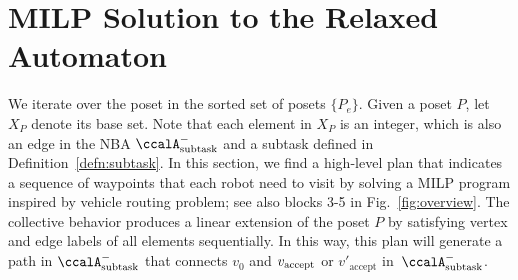 \documentclass[Afour,sageh,times]{sagej}
\newtheorem{exmp}{Example}
\newcommand{\auto}[1]{\ccalA_{\textup{#1}}}
\newcommand{\vertex}[1]{v_{\textup{#1}}}
\newenvironment{cexmp}
{\addtocounter{exmp}{-1}\begin{exmp}}
  {\end{exmp}}
\begin{document}


\section{MILP Solution to the Relaxed Automaton}\label{sec:solution}
We iterate over the poset in the  sorted set of posets  $\{P_e\}$. Given a poset $P$, let $X_{P}$ denote its base set. Note that each element in $X_P$ is an integer, which is also an edge in the NBA $\auto{subtask}^-$ and a subtask defined in Definition~\ref{defn:subtask}. In this section, we find a high-level plan that indicates  a sequence of waypoints that each robot need to visit by solving a MILP program inspired by vehicle routing problem; see also blocks 3-5 in Fig.~\ref{fig:overview}. The collective behavior produces a linear extension of the poset $P$ by satisfying vertex and edge labels of all elements sequentially. In this way,  this plan will generate a path in $\auto{subtask}^-$ that connects $v_0$ and $\vertex{accept}$ or $v'_{\text{accept}}$ in~$\auto{subtask}^-$.
\end{document}
